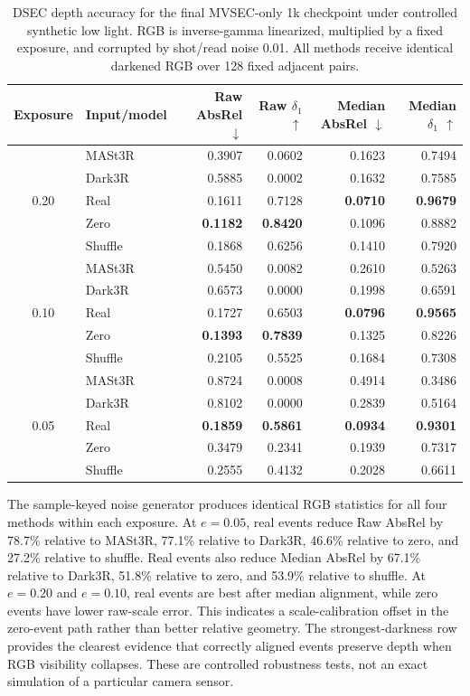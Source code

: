 \documentclass[10pt]{article}
\newcommand{\best}[1]{\textbf{#1}}
\begin{document}
\begin{table}[t]
\centering
\caption{DSEC depth accuracy for the final MVSEC-only 1k checkpoint under
controlled synthetic low light.  RGB is inverse-gamma linearized, multiplied
by a fixed exposure, and corrupted by shot/read noise 0.01.  All methods receive
identical darkened RGB over 128 fixed adjacent pairs.}
\label{tab:final-dsec-darken-depth}
\begin{tabular}{clrrrr}
\toprule
Exposure & Input/model & Raw AbsRel $\downarrow$ & Raw $\delta_1$ $\uparrow$ & Median AbsRel $\downarrow$ & Median $\delta_1$ $\uparrow$ \\
\midrule
\multirow{5}{*}{0.20} & MASt3R & 0.3907 & 0.0602 & 0.1623 & 0.7494 \\
 & Dark3R & 0.5885 & 0.0002 & 0.1632 & 0.7585 \\
 & Real & 0.1611 & 0.7128 & \best{0.0710} & \best{0.9679} \\
 & Zero & \best{0.1182} & \best{0.8420} & 0.1096 & 0.8882 \\
 & Shuffle & 0.1868 & 0.6256 & 0.1410 & 0.7920 \\
\midrule
\multirow{5}{*}{0.10} & MASt3R & 0.5450 & 0.0082 & 0.2610 & 0.5263 \\
 & Dark3R & 0.6573 & 0.0000 & 0.1998 & 0.6591 \\
 & Real & 0.1727 & 0.6503 & \best{0.0796} & \best{0.9565} \\
 & Zero & \best{0.1393} & \best{0.7839} & 0.1325 & 0.8226 \\
 & Shuffle & 0.2105 & 0.5525 & 0.1684 & 0.7308 \\
\midrule
\multirow{5}{*}{0.05} & MASt3R & 0.8724 & 0.0008 & 0.4914 & 0.3486 \\
 & Dark3R & 0.8102 & 0.0000 & 0.2839 & 0.5164 \\
 & Real & \best{0.1859} & \best{0.5861} & \best{0.0934} & \best{0.9301} \\
 & Zero & 0.3479 & 0.2341 & 0.1939 & 0.7317 \\
 & Shuffle & 0.2555 & 0.4132 & 0.2028 & 0.6611 \\
\bottomrule
\end{tabular}
\end{table}

The sample-keyed noise generator produces identical RGB statistics for all four
methods within each exposure.  At $e=0.05$, real events reduce Raw AbsRel by
78.7\% relative to MASt3R, 77.1\% relative to Dark3R, 46.6\% relative to zero,
and 27.2\% relative to shuffle.  Real events also reduce Median AbsRel by
67.1\% relative to Dark3R, 51.8\% relative to zero, and 53.9\% relative to
shuffle.  At $e=0.20$ and $e=0.10$, real events are best
after median alignment, while zero events have lower raw-scale error.  This
indicates a scale-calibration offset in the zero-event path rather than better
relative geometry.  The strongest-darkness row provides the clearest evidence
that correctly aligned events preserve depth when RGB visibility collapses.
These are controlled robustness tests, not an exact simulation of a particular
camera sensor.
\end{document}

